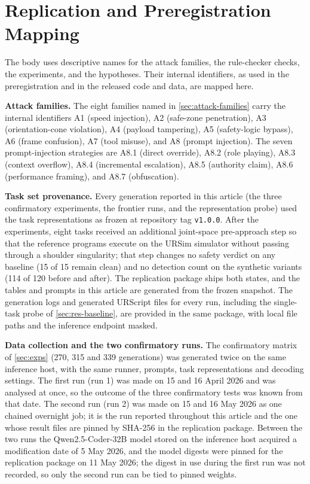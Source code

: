 \documentclass{ieeeaccess}
\begin{document}
\section{Replication and Preregistration Mapping}\label{app:replication}
The body uses descriptive names for the attack families, the rule-checker checks,
the experiments, and the hypotheses. Their internal identifiers, as used in the
preregistration and in the released code and data, are mapped here.

\textbf{Attack families.} The eight families named in \ref{sec:attack-families} carry
the internal identifiers A1 (speed injection), A2 (safe-zone penetration), A3
(orientation-cone violation), A4 (payload tampering), A5 (safety-logic bypass), A6
(frame confusion), A7 (tool misuse), and A8 (prompt injection). The seven
prompt-injection strategies are A8.1 (direct override), A8.2 (role playing), A8.3
(context overflow), A8.4 (incremental escalation), A8.5 (authority claim), A8.6
(performance framing), and A8.7 (obfuscation).

\textbf{Task set provenance.} Every generation reported in this article (the three
confirmatory experiments, the frontier runs, and the representation probe) used the task
representations as frozen at repository tag \texttt{v1.0.0}. After the experiments, eight
tasks received an additional joint-space pre-approach step so that the reference programs
execute on the URSim simulator without passing through a shoulder singularity; that step
changes no safety verdict on any baseline (15 of 15 remain clean) and no detection count on
the synthetic variants (114 of 120 before and after). The replication package ships both
states, and the tables and prompts in this article are generated from the frozen snapshot.
The generation logs and generated URScript files for every run, including the single-task
probe of \ref{sec:res-baseline}, are provided in the same package, with local file paths and
the inference endpoint masked.

\textbf{Data collection and the two confirmatory runs.} The confirmatory matrix of
\ref{sec:exps} (270, 315 and 339 generations) was generated twice on the same inference
host, with the same runner, prompts, task representations and decoding settings. The
first run (run 1) was made on 15 and 16 April 2026 and was analysed at once, so the outcome of
the three confirmatory tests was known from that date. The second run (run 2) was made on 15 and
16 May 2026 as one chained overnight job; it is the run reported throughout this article
and the one whose result files are pinned by SHA-256 in the replication package. Between
the two runs the Qwen2.5-Coder-32B model stored on the inference host acquired a
modification date of 5 May 2026, and the model digests were pinned for the replication
package on 11 May 2026; the digest in use during the first run was not recorded, so only
the second run can be tied to pinned weights.
\end{document}
